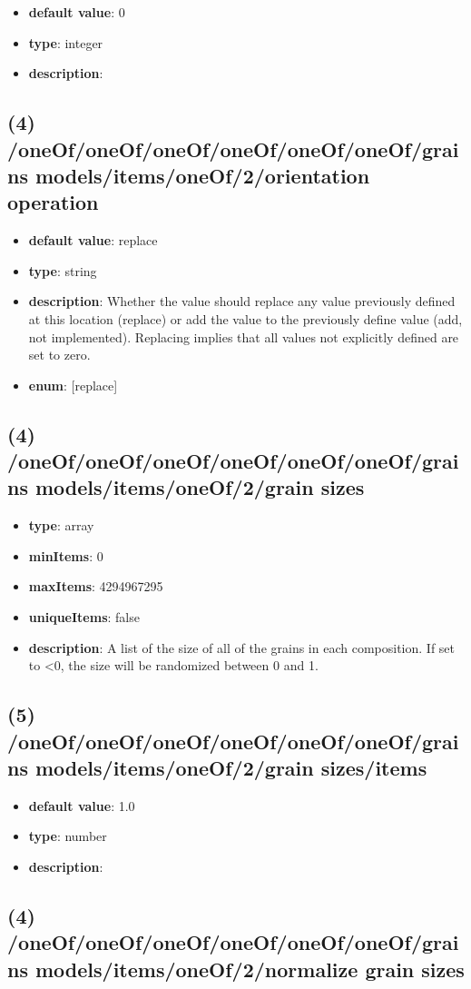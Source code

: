 \begin{itemize}[leftmargin=5em]\item {\bf default value}: 0
\item {\bf type}: integer
\item {\bf description}: 
\end{itemize}\subsection{(4) /oneOf/oneOf/oneOf/oneOf/oneOf/oneOf/grains models/items/oneOf/2/orientation operation}
\begin{itemize}[leftmargin=4em]\item {\bf default value}: replace
\item {\bf type}: string
\item {\bf description}: Whether the value should replace any value previously defined at this location (replace) or add the value to the previously define value (add, not implemented). Replacing implies that all values not explicitly defined are set to zero.
\item {\bf enum}: [replace]\end{itemize}\subsection{(4) /oneOf/oneOf/oneOf/oneOf/oneOf/oneOf/grains models/items/oneOf/2/grain sizes}
\begin{itemize}[leftmargin=4em]\item {\bf type}: array
\item {\bf minItems}: 0
\item {\bf maxItems}: 4294967295
\item {\bf uniqueItems}: false
\item {\bf description}: A list of the size of all of the grains in each composition. If set to <0, the size will be randomized between 0 and 1.
\end{itemize}\subsection{(5) /oneOf/oneOf/oneOf/oneOf/oneOf/oneOf/grains models/items/oneOf/2/grain sizes/items}
\begin{itemize}[leftmargin=5em]\item {\bf default value}: 1.0
\item {\bf type}: number
\item {\bf description}: 
\end{itemize}\subsection{(4) /oneOf/oneOf/oneOf/oneOf/oneOf/oneOf/grains models/items/oneOf/2/normalize grain sizes}
